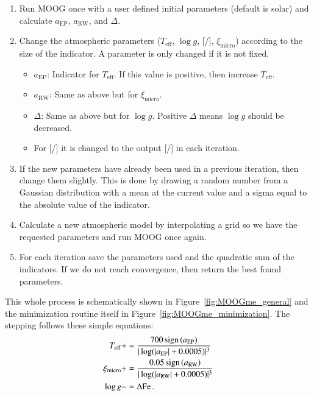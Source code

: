\documentclass{aa}
\DeclareMathOperator{\sign}{sign}
\begin{document}
\begin{enumerate}
    \item Run MOOG once with a user defined initial parameters (default is
          solar) and calculate $a_\mathrm{EP}$, $a_\mathrm{RW}$, and
          $\Delta$.
    \item Change the atmospheric parameters ($T_\mathrm{eff}$, $\log g$,
          [/], $\xi_\mathrm{micro}$) according to the size of the
          indicator. A parameter is only changed if it is not fixed.
    \begin{itemize}
        \item $a_\mathrm{EP}$: Indicator for $T_\mathrm{eff}$. If this value
              is positive, then increase $T_\mathrm{eff}$.
        \item $a_\mathrm{RW}$: Same as above but for $\xi_\mathrm{micro}$.
        \item $\Delta$: Same as above but for $\log g$. Positive
              $\Delta$ means $\log g$ should be decreased.
        \item For [/] it is changed to the output [/]
              in each iteration.
    \end{itemize}
    \item If the new parameters have already been used in a previous iteration,
          then change them slightly. This is done by drawing a random number from
          a Gaussian distribution with a mean at the current value and a sigma
          equal to the absolute value of the indicator.
    \item Calculate a new atmospheric model by interpolating a grid so we have
          the requested parameters and run MOOG once again.
    \item For each iteration save the parameters used and the quadratic sum of
          the indicators. If we do not reach convergence, then return the best
          found parameters.
\end{enumerate}
This whole process is schematically shown in Figure~\ref{fig:MOOGme_general}
and the minimization routine itself in Figure~\ref{fig:MOOGme_minimization}.
The stepping follows these simple equations:
\begin{align}
    T_\mathrm{eff}     &+= \frac{700\sign{(a_\mathrm{EP})}}{|\log(|a_\mathrm{EP}|+0.0005)|^3} \\
    \xi_\mathrm{micro} &+= \frac{0.05\sign{(a_\mathrm{RW})}}{|\log(|a_\mathrm{RW}|+0.0005)|^3} \\
    \log g             &-= \Delta\ion{Fe}.
\end{align}
\end{document}
